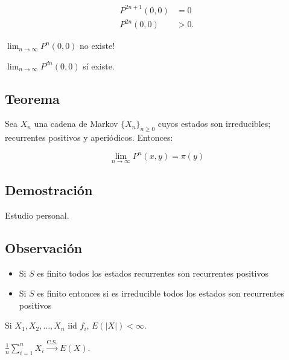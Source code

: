 \documentclass[12pt,a4paper]{article}
\begin{document}
\begin{mdframed}[
    backgroundcolor=gray!10,
    linecolor=gray,
    linewidth=1pt,
    roundcorner=5pt,
    innertopmargin=10pt,
    innerbottommargin=10pt,
    innerleftmargin=10pt,
    innerrightmargin=10pt
]
\begin{align*}
P^{2n+1}(0,0) &= 0 \\
P^{2n}(0,0) &> 0.
\end{align*}

$\lim_{n \to \infty} P^n(0,0)$ no existe!

$\lim_{n \to \infty} P^{dn}(0,0)$ sí existe.

\end{mdframed}

\subsection*{Teorema}

Sea $X_n$ una cadena de Markov $\{X_n\}_{n \geq 0}$ cuyos estados son irreducibles; recurrentes positivos y aperiódicos. Entonces:

\begin{equation*}
\lim_{n \to \infty} P^n(x,y) = \pi(y)
\end{equation*}

\subsection*{Demostración}

Estudio personal.

\subsection*{Observación}

\begin{itemize}
    \item Si $S$ es finito todos los estados recurrentes son recurrentes positivos
    \item Si $S$ es finito entonces si es irreducible todos los estados son recurrentes positivos
\end{itemize}

\begin{mdframed}[
    backgroundcolor=blue!10,
    linecolor=blue,
    linewidth=1pt,
    roundcorner=5pt,
    innertopmargin=10pt,
    innerbottommargin=10pt,
    innerleftmargin=10pt,
    innerrightmargin=10pt
]

Si $X_1, X_2, \dots, X_n$ iid $f_i$, $E(|X|) < \infty$.

$\frac{1}{n} \sum_{i=1}^{n} X_i \xrightarrow{\text{C.S.}} E(X)$.

\end{mdframed}
\end{document}
